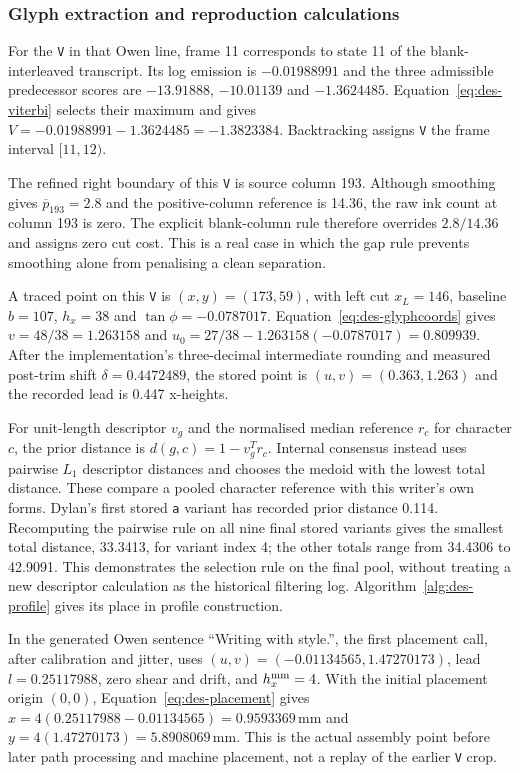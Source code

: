 \subsubsection{Glyph extraction and reproduction calculations}
For the \texttt{V} in that Owen line, frame 11 corresponds to state 11 of the blank-interleaved transcript. Its log emission is $-0.01988991$ and the three admissible predecessor scores are $-13.91888$, $-10.01139$ and $-1.3624485$. Equation~\ref{eq:des-viterbi} selects their maximum and gives $V=-0.01988991-1.3624485=-1.3823384$. Backtracking assigns \texttt{V} the frame interval $[11,12)$.

The refined right boundary of this \texttt{V} is source column 193. Although smoothing gives $\overline p_{193}=2.8$ and the positive-column reference is 14.36, the raw ink count at column 193 is zero. The explicit blank-column rule therefore overrides $2.8/14.36$ and assigns zero cut cost. This is a real case in which the gap rule prevents smoothing alone from penalising a clean separation.

A traced point on this \texttt{V} is $(x,y)=(173,59)$, with left cut $x_L=146$, baseline $b=107$, $h_x=38$ and $\tan\phi=-0.0787017$. Equation~\ref{eq:des-glyphcoords} gives $v=48/38=1.263158$ and $u_0=27/38-1.263158(-0.0787017)=0.809939$. After the implementation's three-decimal intermediate rounding and measured post-trim shift $\delta=0.4472489$, the stored point is $(u,v)=(0.363,1.263)$ and the recorded lead is 0.447 x-heights.

For unit-length descriptor $v_g$ and the normalised median reference $r_c$ for character $c$, the prior distance is $d(g,c)=1-v_g^Tr_c$. Internal consensus instead uses pairwise $L_1$ descriptor distances and chooses the medoid with the lowest total distance. These compare a pooled character reference with this writer's own forms. Dylan's first stored \texttt{a} variant has recorded prior distance 0.114. Recomputing the pairwise rule on all nine final stored variants gives the smallest total distance, 33.3413, for variant index 4; the other totals range from 34.4306 to 42.9091. This demonstrates the selection rule on the final pool, without treating a new descriptor calculation as the historical filtering log. Algorithm~\ref{alg:des-profile} gives its place in profile construction.

In the generated Owen sentence ``Writing with style.'', the first placement call, after calibration and jitter, uses $(u,v)=(-0.01134565,1.47270173)$, lead $l=0.25117988$, zero shear and drift, and $h_x^{\rm mm}=4$. With the initial placement origin $(0,0)$, Equation~\ref{eq:des-placement} gives $x=4(0.25117988-0.01134565)=0.9593369$\,mm and $y=4(1.47270173)=5.8908069$\,mm. This is the actual assembly point before later path processing and machine placement, not a replay of the earlier \texttt{V} crop.

